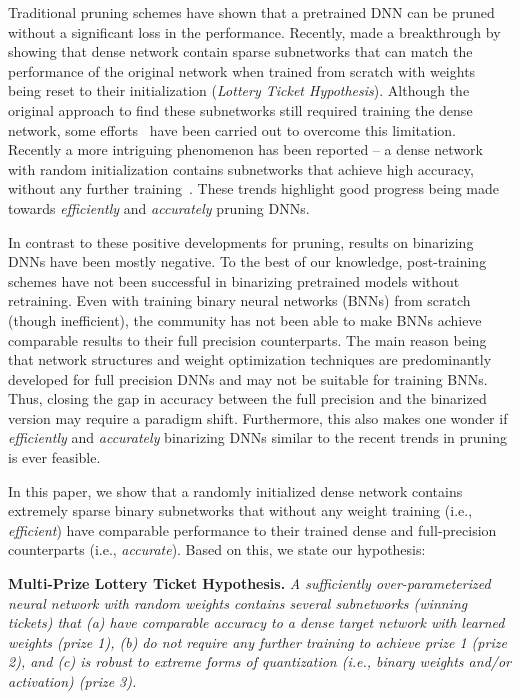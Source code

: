 \documentclass{article} \usepackage{iclr2021_conference,times}
\begin{document}
Traditional pruning schemes have shown that a pretrained DNN can be pruned without a significant loss in the performance. Recently, \citep{frankle2018lottery} made a breakthrough by showing that dense network contain sparse subnetworks that can match the performance of the original network when trained from scratch with weights being reset to their initialization (\emph{Lottery Ticket Hypothesis}).
Although the original approach to find these subnetworks still required training the dense network, some efforts~\citep{2wang2020pruning, you2019drawing, 1wang2020picking} have been carried out to overcome this limitation. Recently a more intriguing phenomenon has been reported -- a dense network with random initialization contains subnetworks that achieve high accuracy, without any further training~\citep{zhou2019deconstructing, ramanujan2019whats, malach2020proving, orseau2020logarithmic}. These trends highlight good progress being made towards \emph{efficiently} and \emph{accurately} pruning DNNs.

In contrast to these positive developments for pruning, results on binarizing DNNs have been mostly negative. To the best of our knowledge, post-training schemes have not been successful in binarizing pretrained models without retraining. 
Even with training binary neural networks (BNNs) from scratch (though inefficient), the community has not been able to make BNNs achieve comparable results to their full precision counterparts. The main reason being that network structures and weight optimization techniques are predominantly developed for full precision DNNs and may not be suitable for training BNNs. Thus, closing the gap in accuracy between the full precision and the binarized version may require a paradigm shift. Furthermore, this also makes one wonder if \emph{efficiently} and \emph{accurately} binarizing DNNs similar to the recent trends in pruning is ever feasible.

In this paper, we show that a randomly initialized dense network contains extremely sparse binary subnetworks that without any weight training (i.e., \emph{efficient}) have comparable performance to their trained dense and full-precision counterparts (i.e., \emph{accurate}). Based on this, we state our hypothesis:

\noindent
\begin{tcolorbox}[colframe=black,colback=lightgray!50,boxrule=1pt,boxsep=4pt,left=1pt,right=1pt,top=0pt,bottom=0pt]
\noindent \textbf{Multi-Prize Lottery Ticket Hypothesis.} \emph{A sufficiently over-parameterized neural network with random weights contains several subnetworks (winning tickets) that (a) have comparable accuracy to a dense target network with learned weights (prize 1), (b) do not require any further training to achieve prize 1 (prize 2), and (c) is robust to extreme forms of quantization (i.e., binary weights and/or activation) (prize 3).}
\end{tcolorbox}
\vspace*{-2.5mm}
\end{document}
